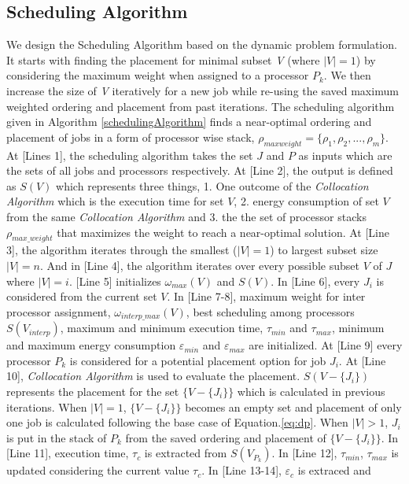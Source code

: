 \subsection{Scheduling Algorithm}
We design the Scheduling Algorithm based on the dynamic problem formulation. It starts with finding the placement
for minimal subset \emph{V} (where $|V|=1$) by considering the maximum weight when assigned to a processor $P_k$. We then increase
the size of \emph{V} iteratively for a new job while re-using the saved maximum weighted ordering and placement from past 
iterations.
The scheduling algorithm given in Algorithm \ref{schedulingAlgorithm} finds a near-optimal ordering and placement of jobs in a 
form of processor
wise stack, $\rho_{max weight}=\{\rho_1, \rho_2,..., \rho_m\}$. At [Lines 1], the scheduling algorithm takes the set $J$ and $P$
as inputs which are the sets of all jobs and processors respectively. At [Line 2], the output is defined as $S(V)$ which represents
three things, 1. One outcome of the \emph{Collocation Algorithm} which is the execution time for set $V$, 2. energy consumption 
of set $V$ from the same \emph{Collocation Algorithm} and 3. the the set of processor stacks $\rho_{max\_weight}$ that maximizes 
the weight to reach a near-optimal solution. At [Line 3], the 
algorithm iterates through the smallest ($|V|=1$) to largest subset size $|V|=n$. And in [Line 4], the algorithm iterates over 
every possible subset $V$ of $J$ where $|V|=i$. [Line 5] 
initializes $\omega_{max}(V)$ and $S(V)$. In [Line 6], every $J_i$ is considered from the current set $V$. In [Line 7-8],
maximum weight for inter processor assignment, $\omega_{interp\_max}(V)$, best scheduling among processors $S(V_{interp})$, 
maximum and minimum 
execution time, $\tau_{min}$ and $\tau_{max}$, minimum and maximum energy consumption $\varepsilon_{min}$ and $\varepsilon_{max}$
are initialized. At [Line 9] every processor $P_k$ is considered for a potential placement option for job $J_i$. At [Line 10],
\emph{Collocation Algorithm} is used to evaluate the placement. $S(V-\{J_i\})$ represents the placement for the set $\{V-\{J_i\}\}$
which is calculated in previous iterations. When $|V|=1$, $\{V-\{J_i\}\}$ becomes an empty set and placement of only one job is 
calculated following the base case of Equation.\ref{eq:dp}. When $|V|>1$, $J_i$ is put in the stack of $P_k$ from the saved 
ordering and placement of $\{V-\{J_i\}\}$. In [Line 11], 
execution time, $\tau_c$ is extracted from $S(V_{P_k})$. In [Line 12], $\tau_{min}$,
 $\tau_{max}$ is updated considering the current value $\tau_c$. In [Line 13-14], $\varepsilon_{c}$ is extraced and 
